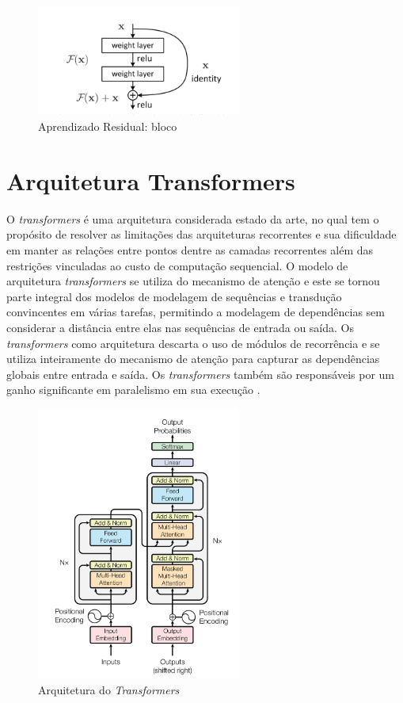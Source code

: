 \begin{figure}[htbp]
    \centering
    \includegraphics[width=0.6\textwidth]{figures/fig003.png}
    \caption{Aprendizado Residual: bloco}
    \label{fig:fig003}
\end{figure}

\section{Arquitetura Transformers}

O \textit{transformers} é uma arquitetura considerada estado da arte, no qual tem o propósito de resolver as limitações das arquiteturas recorrentes e sua dificuldade em manter as relações entre pontos dentre as camadas recorrentes além das restrições vinculadas ao custo de computação sequencial. O modelo de arquitetura \textit{transformers} se utiliza do mecanismo de atenção e este se tornou parte integral dos modelos de modelagem de sequências e transdução convincentes em várias tarefas, permitindo a modelagem de dependências sem considerar a distância entre elas nas sequências de entrada ou saída. Os \textit{transformers} como arquitetura descarta o uso de módulos de recorrência e se utiliza inteiramente do mecanismo de atenção para capturar as dependências globais entre entrada e saída. Os \textit{transformers} também são responsáveis por um ganho significante em paralelismo em sua execução \cite{vaswaniAttentionAllYou2023}.

\begin{figure}[htbp]
    \centering
    \includegraphics[width=0.6\textwidth]{figures/fig004.png}
    \caption{Arquitetura do \textit{Transformers}}
    \label{fig:fig004}
\end{figure}


